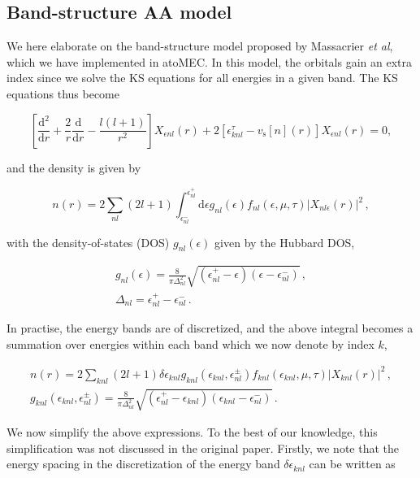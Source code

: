 \documentclass[preprint,aps]{revtex4-2}
\begin{document}
\hypertarget{band-structure-aa-model}{%
\subsection{Band-structure AA model}\label{band-structure-aa-model}}

We here elaborate on the band-structure model proposed by Massacrier
\emph{et al}, which we have implemented in atoMEC. In this model, the
orbitals gain an extra index since we solve the KS equations for all
energies in a given band. The KS equations thus become

\begin{equation}
\left[\frac{\textrm{d}^2}{\textrm{d}r} + \frac{2}{r}\frac{\textrm{d}}{\textrm{d}r} - \frac{l(l+1)}{r^2} \right] X_{\epsilon nl}(r) + 2 \left[\epsilon^{\tau}_{knl} - v_\textrm{s}[n](r) \right] X_{\epsilon nl}(r) = 0,
\end{equation}

and the density is given by

\begin{equation}
    n(r) = 2\sum_{nl}(2l+1)
    \int_{\epsilon_{nl}^-}^{\epsilon_{nl}^+} \textrm{d}{\epsilon} g_{nl}(\epsilon) f_{nl}(\epsilon,\mu,\tau) |X_{nl\epsilon}(r)|^2\,,
\end{equation}

with the density-of-states (DOS) \(g_{nl}(\epsilon)\) given by the
Hubbard DOS,

\begin{gather}
g_{nl}(\epsilon) =\frac{8}{ \pi \Delta_{nl}^2} \sqrt{(\epsilon^+_{nl}-\epsilon)(\epsilon - \epsilon^-_{nl})}\,,\\
\Delta_{nl} = \epsilon^+_{nl}-\epsilon_{nl}^- \,.
\end{gather}

In practise, the energy bands are of discretized, and the above integral
becomes a summation over energies within each band which we now denote
by index \(k\),

\begin{gather}
 n(r) = 2\sum_{knl}(2l+1) \delta\epsilon_{knl} g_{knl}(\epsilon_{knl},\epsilon_{nl}^\pm) f_{knl}(\epsilon_{knl},\mu,\tau) |X_{knl}(r)|^2\,,\\
 g_{knl}(\epsilon_{knl},\epsilon_{nl}^\pm) =\frac{8}{ \pi \Delta_{nl}^2} \sqrt{(\epsilon^+_{nl}-\epsilon_{knl})(\epsilon_{knl} - \epsilon^-_{nl})}\,.
\end{gather}

We now simplify the above expressions. To the best of our knowledge,
this simplification was not discussed in the original paper. Firstly, we
note that the energy spacing in the discretization of the energy band
\(\delta\epsilon_{knl}\) can be written as
\end{document}
